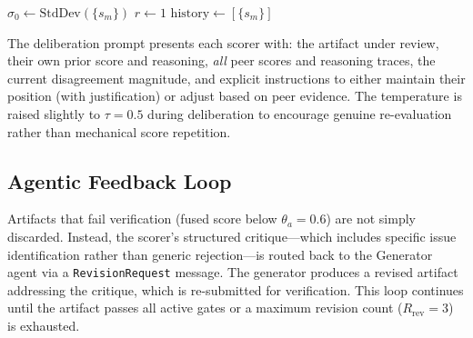 \documentclass[sigconf]{acmart}
\begin{document}
\begin{algorithm}[t]
\caption{Deliberative Consensus Protocol}
\label{alg:deliberation}

$\sigma_0 \leftarrow \text{StdDev}(\{s_m\})$\;
$r \leftarrow 1$\;
$\text{history} \leftarrow [\{s_m\}]$\;

\;
\end{algorithm}

The deliberation prompt presents each scorer with: the artifact under review, their own prior score and reasoning, \emph{all} peer scores and reasoning traces, the current disagreement magnitude, and explicit instructions to either maintain their position (with justification) or adjust based on peer evidence. The temperature is raised slightly to $\tau=0.5$ during deliberation to encourage genuine re-evaluation rather than mechanical score repetition.

\subsection{Agentic Feedback Loop}

Artifacts that fail verification (fused score below $\theta_a = 0.6$) are not simply discarded. Instead, the scorer's structured critique---which includes specific issue identification rather than generic rejection---is routed back to the Generator agent via a \texttt{RevisionRequest} message. The generator produces a revised artifact addressing the critique, which is re-submitted for verification. This loop continues until the artifact passes all active gates or a maximum revision count ($R_{\text{rev}}=3$) is exhausted.
\end{document}

